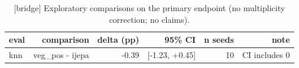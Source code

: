 \begin{table}[t]
\centering
\small
\caption{[bridge] Exploratory comparisons on the primary endpoint (no multiplicity correction; no claims).}
\label{tab:exploratory_comparisons}
\begin{tabular}{lrrrrr}
\toprule
eval & comparison & delta (pp) & 95\% CI & n seeds & note \\
\midrule
knn & veg\_pos - ijepa & -0.39 & [-1.23, +0.45] & 10 & CI includes 0 \\
\bottomrule
\end{tabular}
\end{table}
